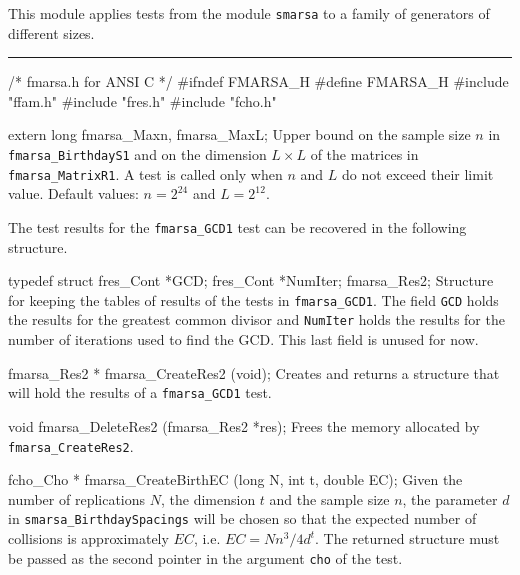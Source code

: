 
This module applies tests from the module {\tt smarsa}
to a family of generators of different sizes.


\bigskip\hrule
\code\hide
/* fmarsa.h for ANSI C */
#ifndef FMARSA_H
#define FMARSA_H
\endhide
#include "ffam.h"
#include "fres.h"
#include "fcho.h"


extern long fmarsa_Maxn, fmarsa_MaxL;
\endcode
\tab
  Upper bound on the sample size $n$  in {\tt fmarsa\_BirthdayS1} and on
  the dimension  $L \times L$ of the matrices in {\tt fmarsa\_MatrixR1}.
  A test is called only when $n$ and $L$ do not exceed their limit value.
  Default values: $n = 2^{24}$ and $L = 2^{12}$.
\endtab

\ifdetailed  %



The test results for the {\tt fmarsa\_GCD1} test can be recovered
in the following structure.

\code

typedef struct {
   fres_Cont *GCD;
   fres_Cont *NumIter; 
} fmarsa_Res2;
\endcode
 \tab
  Structure for keeping the tables of results of the tests in
  {\tt fmarsa\_GCD1}. The field {\tt GCD} holds the results for the
  greatest common divisor  and {\tt NumIter} holds the results for the
  number of iterations used to find the GCD.
  This last field is unused for now.
 \endtab
\code


fmarsa_Res2 * fmarsa_CreateRes2 (void);
\endcode
 \tab 
  Creates and returns a structure that will hold the results
  of a  {\tt fmarsa\_GCD1} test. 
 \endtab
\code


void fmarsa_DeleteRes2 (fmarsa_Res2 *res);
\endcode
 \tab 
  Frees the memory allocated by {\tt fmarsa\_CreateRes2}.
 \endtab

\fi    %




\code

fcho_Cho * fmarsa_CreateBirthEC (long N, int t, double EC);
\endcode
 \tab 
  Given the number of replications $N$, the dimension $t$ and the sample
  size $n$, the parameter $d$ in {\tt smarsa\_BirthdaySpacings} will be chosen
  so that the expected number of collisions is approximately $EC$,
  i.e. $EC = Nn^3/4d^t$.
  The returned structure must be passed as the second pointer in the
  argument {\tt cho} of the test.
 \endtab
\code


